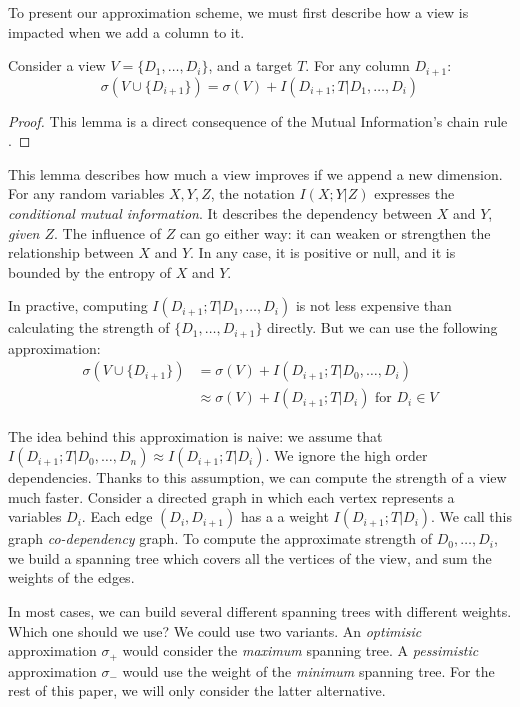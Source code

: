To present our approximation scheme, we must first describe how a
view is impacted when we add a column to it.

\begin{lemma}\label{lem:chain}
Consider a view $V = \{D_1, \ldots, D_i\}$, and a target $T$.
For any column $D_{i+1}$: 
$$
\sigma(V \cup \{D_{i+1}\}) =  \sigma(V) + I(D_{i+1} ; T | D_1 , \ldots, D_i)
 $$
\end{lemma}
\begin{proof}
This lemma is a direct consequence of the Mutual Information's chain rule
\cite{cover2012elements}.
\end{proof}

This lemma describes how much a view improves if we append a new dimension.
For any random variables $X,Y,Z$, the notation $I(X;Y|Z)$ expresses the
\emph{conditional mutual information}. It describes the dependency between $X$
and $Y$, \emph{given $Z$}. The influence of $Z$ can go either way: it can
weaken or strengthen the relationship between $X$ and $Y$. In any case, it is
positive or null, and it is bounded by the entropy of $X$ and $Y$.

In practive, computing $ I(D_{i+1} ; T | D_1 , \ldots, D_i)$ is not less
expensive than calculating the strength of $\{D_1, \ldots, D_{i+1}\}$ directly.
But we can use the following approximation:
\[
\begin{split}
    \sigma(V \cup \{D_{i+1}\}) & = \sigma(V)   + I(D_{i+1} ; T | D_0, \ldots, D_{i})\\
                           & \approx \sigma(V) + I(D_{i+1} ; T | D_{i})
\text{ for } D_i \in V
\end{split}
\]

The idea behind this approximation is naive: we assume that $I(D_{i+1} ; T |
D_0, \ldots, D_{n}) \approx I(D_{i+1} ; T | D_{i})$. We ignore the high order
dependencies. Thanks to this assumption, we can compute the strength of a view
much faster.  Consider a directed graph in which each vertex represents a
variables $D_i$. Each edge $(D_i, D_{i+1})$ has a a weight $ I(D_{i+1} ; T |
D_{i})$.  We call this graph \emph{co-dependency} graph.  To compute the
approximate strength of ${D_0, \ldots, D_i}$, we build a spanning tree which
covers all the vertices of the view, and sum the weights of the edges.

In most cases, we can build several different spanning trees with different
weights. Which one should we use? We could use two variants. An
\emph{optimisic} approximation $\sigma_+ $ would consider the \emph{maximum}
spanning tree.  A \emph{pessimistic} approximation $\sigma_- $ would use the
weight of the \emph{minimum} spanning tree. For the rest of this paper, we will
only consider the latter alternative. 

